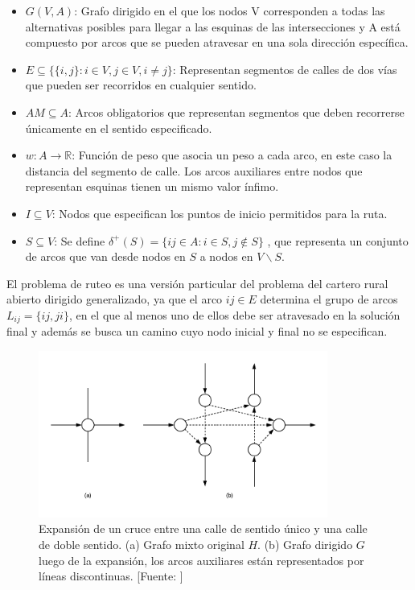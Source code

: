 \begin{itemize}
\item $G(V, A)$: Grafo dirigido en el que los nodos V corresponden a todas las alternativas posibles para llegar a las esquinas de las intersecciones y A está compuesto por arcos que se pueden atravesar en una sola dirección específica.

\item $E \subseteq \{ \{i, j\}: i \in V, j \in V, i \neq j\}$: Representan segmentos de calles de dos vías que pueden ser recorridos en cualquier sentido.

\item $AM \subseteq A $: Arcos obligatorios que representan segmentos que deben recorrerse únicamente en el sentido especificado.

\item $w : A \rightarrow \mathbb{R} $: Función de peso que asocia un peso a cada arco, en este caso la distancia del segmento de calle. Los arcos auxiliares entre nodos que representan esquinas tienen un mismo valor ínfimo.

\item $I \subseteq V $: Nodos que especifican los puntos de inicio permitidos para la ruta.

\item $S \subseteq V$: Se define $\delta^+ (S) = \{i j \in A: i \in S , j \notin S \}$ , que representa un conjunto de arcos que van desde nodos en $S$ a nodos en $V \backslash S$.
\end{itemize}

El problema de ruteo es una versión particular del problema del cartero rural abierto dirigido generalizado, ya que el arco $i j \in E $ determina el grupo de arcos $L_{i j} = \{i j, j i\}$, en el que al menos uno de ellos debe ser atravesado en la solución final y además se busca un camino cuyo nodo inicial y final no se especifican.

\begin{figure}[tbp]
\centerline{\includegraphics[width=9.5cm]{expanded_graph.png}}
\caption{Expansión de un cruce entre una calle de sentido único y una calle de doble sentido. (a) Grafo mixto original $H$. (b) Grafo dirigido $G$ luego de la expansión, los arcos auxiliares están representados por líneas discontinuas. [Fuente: \citet{Braier2017AnArgentina}]}
\label{fig:grafo_expandido}
\end{figure}

